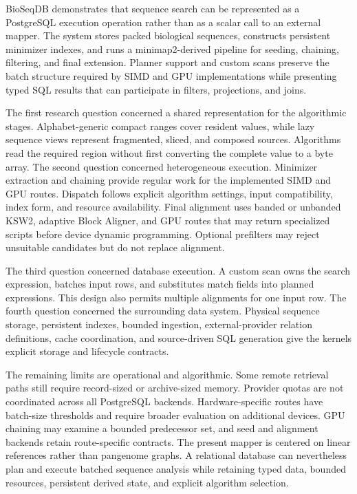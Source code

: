\label{chap:conclusion}

BioSeqDB demonstrates that sequence search can be represented as a PostgreSQL
execution operation rather than as a scalar call to an external mapper. The
system stores packed biological sequences, constructs persistent minimizer
indexes, and runs a minimap2-derived pipeline for seeding, chaining, filtering,
and final extension. Planner support and custom scans preserve the batch
structure required by SIMD and GPU implementations while presenting typed SQL
results that can participate in filters, projections, and joins.

The first research question concerned a shared representation for the
algorithmic stages. Alphabet-generic compact ranges cover resident values,
while lazy sequence views represent fragmented, sliced, and composed sources.
Algorithms read the required region without first converting the complete
value to a byte array. The second question concerned heterogeneous execution. Minimizer
extraction and chaining provide regular work for the implemented SIMD and GPU
routes. Dispatch follows explicit algorithm settings, input compatibility,
index form, and resource availability. Final alignment uses banded or unbanded
KSW2, adaptive Block Aligner, and GPU routes that may return specialized scripts
before device dynamic programming. Optional prefilters may reject unsuitable
candidates but do not replace alignment.

The third question concerned database execution. A custom scan owns the search
expression, batches input rows, and substitutes match fields into planned
expressions. This design also permits multiple alignments for one input row.
The fourth question concerned the surrounding data system. Physical sequence
storage, persistent indexes, bounded ingestion, external-provider relation definitions,
cache coordination, and source-driven SQL generation give the kernels explicit
storage and lifecycle contracts.

The remaining limits are operational and algorithmic. Some remote retrieval
paths still require record-sized or archive-sized memory. Provider quotas are
not coordinated across all PostgreSQL backends. Hardware-specific routes have
batch-size thresholds and require broader evaluation on additional devices.
GPU chaining may examine a bounded predecessor set, and seed and alignment
backends retain route-specific contracts. The present mapper is centered on
linear references rather than pangenome graphs. A relational database can
nevertheless plan and execute batched
sequence analysis while retaining typed data, bounded resources, persistent
derived state, and explicit algorithm selection.
